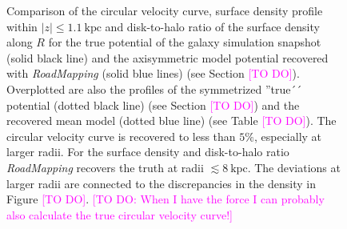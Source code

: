 \documentclass[iop,revtex4,numberedappendix,appendixfloats]{emulateapj}
\newcommand{\RM}{{\sl RoadMapping}}
\newcommand{\Wilma}[1]{\textcolor{Magenta}{#1}}
\begin{document}
\begin{figure}[!htbp]
\caption{Comparison of the circular velocity curve, surface density profile within $|z|\leq1.1~\text{kpc}$ and disk-to-halo ratio of the surface density along $R$ for the true potential of the galaxy simulation snapshot (solid black line) and the axisymmetric model potential recovered with \RM{} (solid blue lines) (see Section \Wilma{[TO DO]}). Overplotted are also the profiles of the symmetrized ''true´´ potential (dotted black line) (see Section \Wilma{[TO DO]}) and the recovered mean model (dotted blue line) (see Table \Wilma{[TO DO]}). The circular velocity curve is recovered to less than $5\%$, especially at larger radii. For the surface density and disk-to-halo ratio \RM{} recovers the truth at radii $\lesssim 8~\text{kpc}$. The deviations at larger radii are connected to the discrepancies in the density in Figure \Wilma{[TO DO]}. \Wilma{[TO DO: When I have the force I can probably also calculate the true circular velocity curve!]}}
\label{fig:???}
\end{figure}
\end{document}
